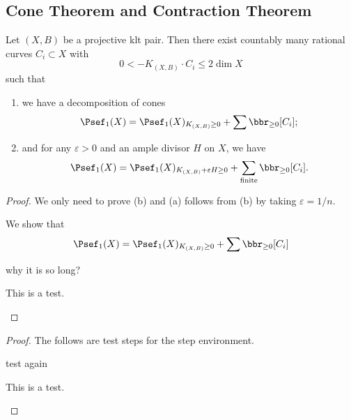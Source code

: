 \subsection{Cone Theorem and Contraction Theorem}

    \begin{theorem}\label{thm: cone theorem}
        Let \((X,B)\) be a projective klt pair.
        Then there exist countably many rational curves \(C_i \subset X\) with 
        \[ 0 < -K_{(X,B)} \cdot C_i \leq 2 \dim X \]
        such that 
        \begin{enumerate}
            \item we have a decomposition of cones
            \[ \Psef_1(X) = \Psef_1(X)_{K_{(X,B)} \geq 0} + \sum \bbr_{\geq 0}[C_i]; \]
            \item and for any \(\varepsilon > 0\) and an ample divisor \(H\) on \(X\), we have 
            \[ \Psef_1(X) = \Psef_1(X)_{K_{(X,B)}+\varepsilon H \geq 0} + \sum_{\text{finite}} \bbr_{\geq 0}[C_i]. \]
        \end{enumerate}
    \end{theorem}
    \begin{proof}
        We only need to prove (b) and (a) follows from (b) by taking \(\varepsilon = 1/n\).

        \begin{step}
            We show that 
            \[ \Psef_1(X) = \Psef_1(X)_{K_{(X,B)} \geq 0} + \sum \bbr_{\geq 0}[C_i] \]
        \end{step}
        why it is so long?


        \begin{step}
            This is a test.
        \end{step}


    \end{proof}

    \begin{proof}
        The follows are test steps for the step environment.
        \begin{step}
            test again
        \end{step}
        \begin{step}
            This is a test.
        \end{step}
    \end{proof}

